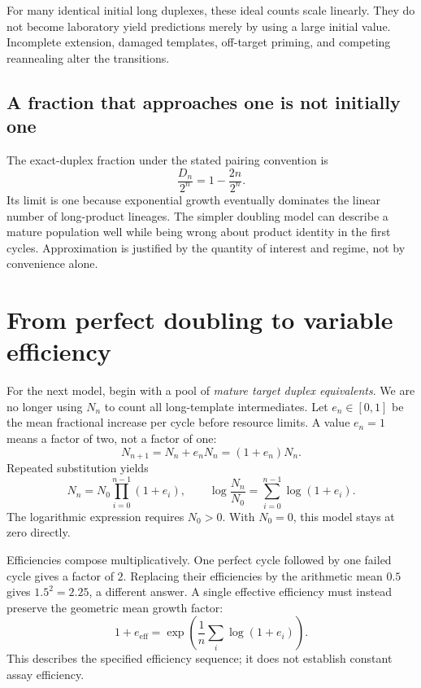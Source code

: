 For many identical initial long duplexes, these ideal counts scale linearly. They do not become laboratory yield predictions merely by using a large initial value. Incomplete extension, damaged templates, off-target priming, and competing reannealing alter the transitions.

\subsection{A fraction that approaches one is not initially one}
The exact-duplex fraction under the stated pairing convention is
\begin{equation}
\frac{D_n}{2^n}=1-\frac{2n}{2^n}.
\end{equation}
Its limit is one because exponential growth eventually dominates the linear number of long-product lineages. The simpler doubling model can describe a mature population well while being wrong about product identity in the first cycles. Approximation is justified by the quantity of interest and regime, not by convenience alone.

\section{From perfect doubling to variable efficiency}
For the next model, begin with a pool of \emph{mature target duplex equivalents}. We are no longer using $N_n$ to count all long-template intermediates. Let $e_n\in[0,1]$ be the mean fractional increase per cycle before resource limits. A value $e_n=1$ means a factor of two, not a factor of one:
\begin{equation}
N_{n+1}=N_n+e_nN_n=(1+e_n)N_n.
\end{equation}
Repeated substitution yields
\begin{equation}
N_n=N_0\prod_{i=0}^{n-1}(1+e_i),\qquad
\log\frac{N_n}{N_0}=\sum_{i=0}^{n-1}\log(1+e_i). \label{eq:growth}
\end{equation}
The logarithmic expression requires $N_0>0$. With $N_0=0$, this model stays at zero directly.

Efficiencies compose multiplicatively. One perfect cycle followed by one failed cycle gives a factor of $2$. Replacing their efficiencies by the arithmetic mean $0.5$ gives $1.5^2=2.25$, a different answer. A single effective efficiency must instead preserve the geometric mean growth factor:
\begin{equation}
1+e_{\mathrm{eff}}
=\exp\left(\frac{1}{n}\sum_i\log(1+e_i)\right).
\end{equation}
This describes the specified efficiency sequence; it does not establish constant assay efficiency.

